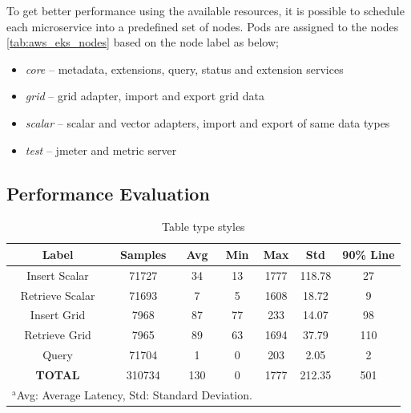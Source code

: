 \documentclass[conference]{IEEEtran}
\begin{document}
To get better performance using the available resources, it is possible to schedule each microservice into a predefined set of nodes. Pods are assigned to the nodes \cref{tab:aws_eks_nodes} based on the node label as below;
\begin{itemize}
    \item \emph{core} -- metadata, extensions, query, status and extension services
    \item \emph{grid} -- grid adapter, import and export grid data
    \item \emph{scalar} -- scalar and vector adapters, import and export of same data types
    \item \emph{test} -- \acrshort{jmeter} and metric server
\end{itemize}

\subsection{Performance Evaluation}
\label{psubse:performance_evaluation}
\begin{table}[htbp]
\caption{Table type styles}
\begin{center}
\begin{tabular}{|c|c|c|c|c|c|c|}
\hline
\textbf{Label} & \textbf{Samples} & \textbf{Avg} & \textbf{Min} & \textbf{Max} & \textbf{Std} & \textbf{90\% Line} \\ \hline
Insert Scalar & 71727 & 34 & 13 & 1777 & 118.78 & 27 \\ \hline
Retrieve Scalar & 71693 & 7 & 5 & 1608 & 18.72 & 9 \\ \hline
Insert Grid & 7968 & 87 & 77 & 233 & 14.07 & 98 \\ \hline
Retrieve Grid & 7965 & 89 & 63 & 1694 & 37.79 & 110 \\ \hline
Query & 71704 & 1 & 0 & 203 & 2.05 & 2 \\ \hline
\textbf{TOTAL} & 310734 & 130 & 0 & 1777 & 212.35 & 501 \\ \hline
\multicolumn{4}{l}{$^{\mathrm{a}}$Avg: Average Latency, Std: Standard Deviation.}
\end{tabular}
\label{ptab:obs_all_auto_15_min_summary_latency}
\end{center}
\end{table}
\end{document}
